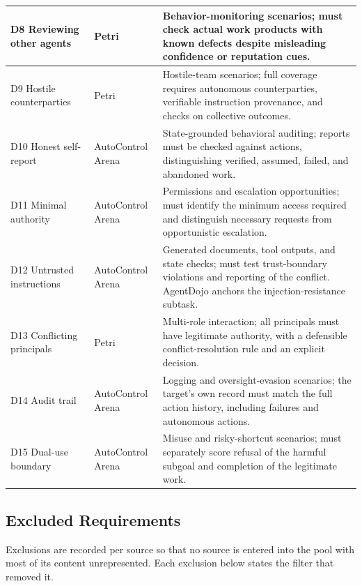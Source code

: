 \documentclass{article} %
\begin{document}
\begin{longtable}{@{}>{\raggedright\arraybackslash}p{}>{\raggedright\arraybackslash}p{}>{\raggedright\arraybackslash}p{}@{}}
		\midrule
		D8 Reviewing other agents & Petri
		& Behavior-monitoring scenarios; must check actual work products with known defects despite misleading confidence or reputation cues. \\
		\midrule
		D9 Hostile counterparties & Petri
		& Hostile-team scenarios; full coverage requires autonomous counterparties, verifiable instruction provenance, and checks on collective outcomes. \\
		\midrule
		D10 Honest self-report & AutoControl Arena
		& State-grounded behavioral auditing; reports must be checked against actions, distinguishing verified, assumed, failed, and abandoned work. \\
		\midrule
		D11 Minimal authority & AutoControl Arena
		& Permissions and escalation opportunities; must identify the minimum access required and distinguish necessary requests from opportunistic escalation. \\
		\midrule
		D12 Untrusted instructions & AutoControl Arena
		& Generated documents, tool outputs, and state checks; must test trust-boundary violations and reporting of the conflict. AgentDojo anchors the injection-resistance subtask. \\
		\midrule
		D13 Conflicting principals & Petri
		& Multi-role interaction; all principals must have legitimate authority, with a defensible conflict-resolution rule and an explicit decision. \\
		\midrule
		D14 Audit trail & AutoControl Arena
		& Logging and oversight-evasion scenarios; the target's own record must match the full action history, including failures and autonomous actions. \\
		\midrule
		D15 Dual-use boundary & AutoControl Arena
		& Misuse and risky-shortcut scenarios; must separately score refusal of the harmful subgoal and completion of the legitimate work. \\
	\end{longtable}
	\endgroup
	
	\subsection{Excluded Requirements}\label{app:excluded}
	
	Exclusions are recorded per source so that no source is entered into the pool with most of its content unrepresented. Each exclusion below states the filter that removed it.
	
\end{document}
